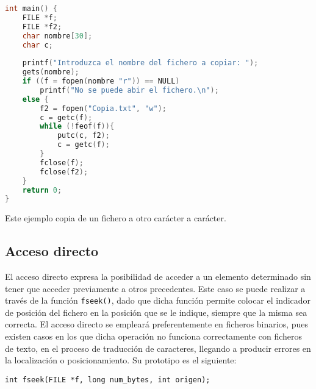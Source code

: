{\begin{Ejemplo}
\begin{lstlisting}[language=C]
int main() {
    FILE *f;
    FILE *f2;
    char nombre[30];
    char c;
    
    printf("Introduzca el nombre del fichero a copiar: ");
    gets(nombre);
    if ((f = fopen(nombre "r")) == NULL)
        printf("No se puede abir el fichero.\n");
    else {
        f2 = fopen("Copia.txt", "w");
        c = getc(f);
        while (!feof(f)){
            putc(c, f2);
            c = getc(f);
        }
        fclose(f);
        fclose(f2);
    }
    return 0;
}
\end{lstlisting}
\Explicacion
Este ejemplo copia de un fichero a otro carácter a carácter.
\end{Ejemplo}
}
\subsection{Acceso directo}{
El acceso directo expresa la posibilidad de acceder a un elemento determinado sin tener que acceder previamente a otros precedentes. Este caso se puede realizar a través de la función \texttt{fseek()}, dado que dicha función permite colocar el indicador de posición del fichero en la posición que se le indique, siempre que la misma sea correcta. El acceso directo se empleará preferentemente en ficheros binarios, pues existen casos en los que dicha operación no funciona correctamente con ficheros de texto, en el proceso de traducción de caracteres, llegando a producir errores en la localización o posicionamiento. Su prototipo es el siguiente:

\texttt{int fseek(FILE *f, long num\_bytes, int origen);}

}

